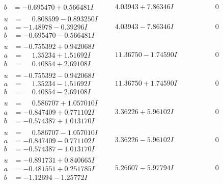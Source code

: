 \documentclass[1p]{elsarticle_modified}
\theoremstyle{definition}
\begin{document}
$$\begin{array}{c|c|c}
\begin{aligned}
b &= -0.695470 + 0.566481 I\end{aligned}
 & \phantom{-}4.03943 + 7.86346 I & \phantom{-0.000000 } 0 \\ \hline\begin{aligned}
u &= \phantom{-}0.808599 - 0.893250 I \\
a &= -1.48978 - 0.39296 I \\
b &= -0.695470 - 0.566481 I\end{aligned}
 & \phantom{-}4.03943 - 7.86346 I & \phantom{-0.000000 } 0 \\ \hline\begin{aligned}
u &= -0.755392 + 0.942068 I \\
a &= \phantom{-}1.35234 + 1.51692 I \\
b &= \phantom{-}0.40854 + 2.69108 I\end{aligned}
 & \phantom{-}11.36750 - 1.74590 I & \phantom{-0.000000 } 0 \\ \hline\begin{aligned}
u &= -0.755392 - 0.942068 I \\
a &= \phantom{-}1.35234 - 1.51692 I \\
b &= \phantom{-}0.40854 - 2.69108 I\end{aligned}
 & \phantom{-}11.36750 + 1.74590 I & \phantom{-0.000000 } 0 \\ \hline\begin{aligned}
u &= \phantom{-}0.586707 + 1.057010 I \\
a &= -0.847409 + 0.771102 I \\
b &= -0.574387 + 1.013170 I\end{aligned}
 & \phantom{-}3.36226 + 5.96102 I & \phantom{-0.000000 } 0 \\ \hline\begin{aligned}
u &= \phantom{-}0.586707 - 1.057010 I \\
a &= -0.847409 - 0.771102 I \\
b &= -0.574387 - 1.013170 I\end{aligned}
 & \phantom{-}3.36226 - 5.96102 I & \phantom{-0.000000 } 0 \\ \hline\begin{aligned}
u &= -0.891731 + 0.840665 I \\
a &= -0.481551 + 0.251785 I \\
b &= -1.12694 - 1.25772 I\end{aligned}
 & \phantom{-}5.26607 - 5.97794 I & \phantom{-0.000000 } 0 \\ \hline\begin{aligned}

\end{aligned}
\end{array}$$
\end{document}
